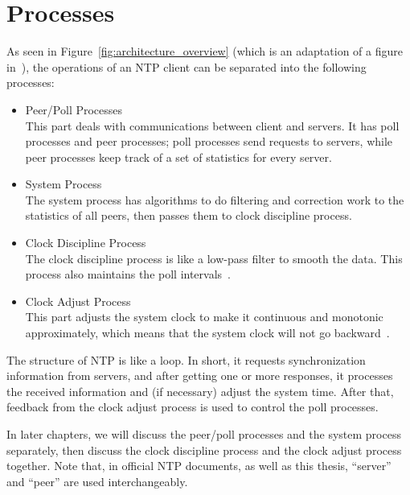 \section{Processes}
\label{sec:processes}
As seen in Figure~\ref{fig:architecture_overview} (which is an adaptation
of a figure in~\cite{redbook}), the operations of an NTP client
can be separated into the following processes:
\begin{itemize}
    \item Peer/Poll Processes\\
        This part deals with communications between client and servers. It has
        poll processes and peer processes; poll processes send requests to
        servers, while peer processes keep track of a set of statistics for every
        server.
    \item System Process\\
        The system process has algorithms to do filtering and correction work
        to the statistics of all peers, then passes them to clock discipline
        process.
    \item Clock Discipline Process\\
        The clock discipline process is like a low-pass filter to smooth the
        data.  This process also maintains the poll intervals~\cite{redbook}.
    \item Clock Adjust Process\\
        This part adjusts the system clock to make it continuous and monotonic
        approximately, which means that the system clock will not go
        backward~\cite{redbook}. 
\end{itemize}



The structure of NTP is like a loop. In short, it requests synchronization
information from servers, and after getting one or more responses, it processes
the received information and (if necessary) adjust the system time.  After
that, feedback from the clock adjust process is used to control the poll
processes.

In later chapters, we will discuss the peer/poll processes and the system
process separately, then discuss the clock discipline process and the clock
adjust process together. Note that, in official NTP documents, as well as this
thesis, ``server'' and ``peer'' are used interchangeably.


